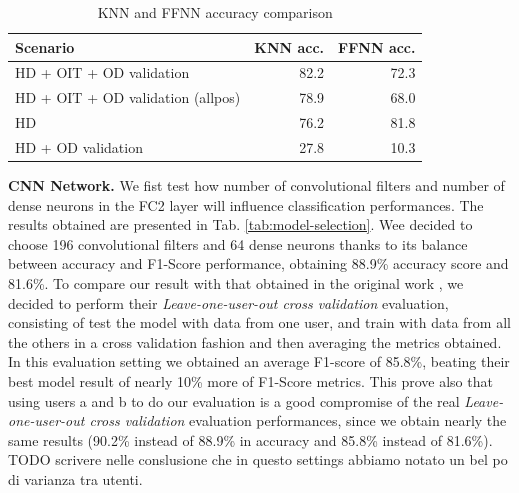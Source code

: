 \begin{table}[H]
  \centering
  \begin{tabular}{p{4cm}rr}
    \hline
    Scenario & KNN acc. & FFNN acc. \\
    \hline
    HD + OIT + OD validation & 82.2  & 72.3 \\
    HD + OIT + OD validation (allpos) &  78.9 & 68.0 \\
    HD & 76.2 & 81.8 \\
    HD + OD validation & 27.8 & 10.3 \\
    \hline
  \end{tabular}
  \caption{KNN and FFNN accuracy comparison}
  \label{tab:ae-classifiers-accuracy}
\end{table}

\textbf{CNN Network.} We fist test how number of convolutional filters and number of dense neurons in the FC2 layer will influence classification performances. The results obtained are presented in Tab. \ref{tab:model-selection}. Wee decided to choose 196 convolutional filters and 64 dense neurons thanks to its balance between accuracy and F1-Score performance, obtaining 88.9\% accuracy score and  81.6\%. To compare our result with that obtained in the original work \cite{blunck2013heterogeneity}, we decided to perform their \textit{Leave-one-user-out cross validation} evaluation, consisting of test the model with data from one user, and train with data from all the others in a cross validation fashion and then averaging the metrics obtained. In this evaluation setting we obtained an average F1-score of 85.8\%, beating their best model result of nearly 10\% more of F1-Score metrics. This prove also that using users a and b to do our evaluation is a good compromise of the real \textit{Leave-one-user-out cross validation} evaluation performances, since we obtain nearly the same results (90.2\% instead of 88.9\% in accuracy and 85.8\% instead of 81.6\%). TODO scrivere nelle conslusione che in questo settings abbiamo notato un bel po di varianza tra utenti.

